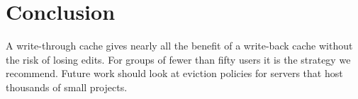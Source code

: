 \chapter{Conclusion}
\label{ch:conclusion}

A write-through cache gives nearly all the benefit of a write-back cache
without the risk of losing edits. For groups of fewer than fifty users it is
the strategy we recommend. Future work should look at eviction policies for
servers that host thousands of small projects.
